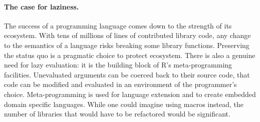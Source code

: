 \documentclass[review,nonacm,screen,acmsmall,anonymous=true]{acmart}
\begin{document}
\paragraph{The case for laziness.} The success of a programming language
comes down to the strength of its ecosystem. With tens of millions of lines of
contributed library code, any change to the semantics of a language risks
breaking some library functions. Preserving the status quo is a pragmatic choice
to protect ecosystem. There is also a genuine need for lazy evaluation: it is
the building block of R's meta-programming facilities. Unevaluated arguments can
be coerced back to their source code, that code can be modified and evaluated in
an environment of the programmer's choice. Meta-programming is used for language
extension and to create embedded domain specific languages. While one could
imagine using macros instead, the number of libraries that would have to be
refactored would be significant.
\end{document}
